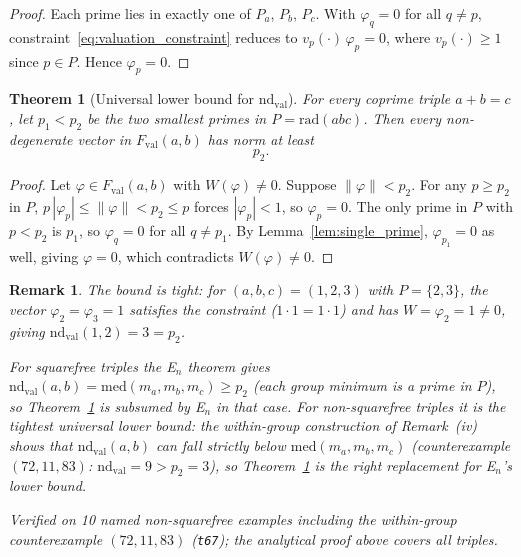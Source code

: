 \documentclass[12pt]{article}
\newtheorem{theorem}{Theorem}
\newtheorem{remark}{Remark}
\theoremstyle{definition}
\begin{document}
\begin{proof}
  Each prime lies in exactly one of $P_a$, $P_b$, $P_c$.
  With $\varphi_q = 0$ for all $q \ne p$, constraint~\eqref{eq:valuation_constraint} reduces to
  $v_p(\cdot)\,\varphi_p = 0$, where $v_p(\cdot) \ge 1$ since $p \in P$.
  Hence $\varphi_p = 0$.
\end{proof}

\begin{theorem}[Universal lower bound for $\mathrm{nd}_{\mathrm{val}}$]\label{thm:nd_lb}
  For every coprime triple $a + b = c$, let $p_1 < p_2$ be the two smallest
  primes in $P = \mathrm{rad}(abc)$.  Then every non-degenerate vector in
  $F_{\mathrm{val}}(a,b)$ has norm at least
  \[
  p_2.
  \]
\end{theorem}

\begin{proof}
  Let $\varphi \in F_{\mathrm{val}}(a,b)$ with $W(\varphi) \ne 0$.  Suppose $\|\varphi\| < p_2$.
  For any $p \ge p_2$ in $P$, $p\,|\varphi_p| \le \|\varphi\| < p_2 \le p$ forces
  $|\varphi_p| < 1$, so $\varphi_p = 0$.
  The only prime in $P$ with $p < p_2$ is $p_1$, so $\varphi_q = 0$ for all $q \ne p_1$.
  By Lemma~\ref{lem:single_prime}, $\varphi_{p_1} = 0$ as well, giving $\varphi = 0$,
  which contradicts $W(\varphi) \ne 0$.
\end{proof}

\begin{remark}
  The bound is tight: for $(a,b,c) = (1,2,3)$ with $P = \{2,3\}$, the vector
  $\varphi_2 = \varphi_3 = 1$ satisfies the constraint ($1 \cdot 1 = 1 \cdot 1$)
  and has $W = \varphi_2 = 1 \ne 0$, giving $\mathrm{nd}_{\mathrm{val}}(1,2) = 3 = p_2$.

  For squarefree triples the E$_n$ theorem gives
  $\mathrm{nd}_{\mathrm{val}}(a,b) = \mathrm{med}(m_a,m_b,m_c) \ge p_2$ (each group minimum is a
  prime in $P$), so Theorem~\ref{thm:nd_lb} is subsumed by E$_n$ in that case.
  For non-squarefree triples it is the tightest universal lower bound:
  the within-group construction of Remark~(iv) shows that
  $\mathrm{nd}_{\mathrm{val}}(a,b)$ can fall strictly below $\mathrm{med}(m_a,m_b,m_c)$
  (counterexample $(72,11,83)$: $\mathrm{nd}_{\mathrm{val}} = 9 > p_2 = 3$),
  so Theorem~\ref{thm:nd_lb} is the right replacement for E$_n$'s lower bound.

  Verified on 10 named non-squarefree examples including the within-group
  counterexample $(72,11,83)$ (\texttt{t67}); the analytical proof above covers all triples.
\end{remark}
\end{document}
